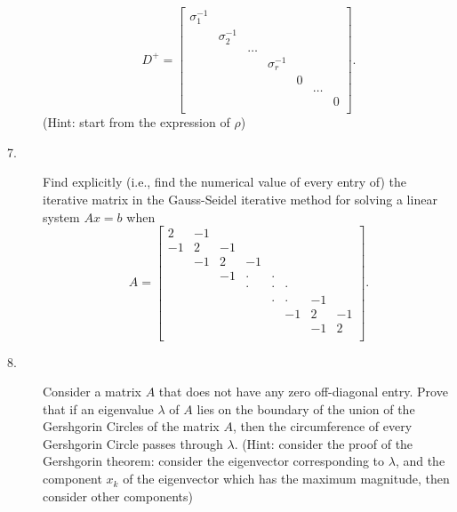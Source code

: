 \documentclass{article}
\begin{document}
\begin{description}
$$D^+ = \begin{bmatrix}
        \sigma_1^{-1} &&&&&& \\
        & \sigma_2^{-1} &&&&& \\
        && \dots &&&& \\
        &&& \sigma_r^{-1} &&& \\
        &&&& 0 && \\
        &&&&& \dots & \\
        &&&&&& 0 \\
        \end{bmatrix}.$$
(Hint: start from the expression of $\rho$)

\item[7.]
Find explicitly (i.e., find the numerical value of every entry of) the
iterative matrix in the Gauss-Seidel iterative method for solving a linear
system $Ax=b$ when
$$A= \begin{bmatrix}
        2&-1&&&&&& \\
        -1 & 2 & -1 &&&&& \\
        & -1 & 2 & -1 &&&& \\
        && -1 & \cdot & \cdot &&& \\
        &&& \cdot & \cdot & \cdot &&\\
        &&&& \cdot & \cdot & -1 & \\
        &&&&& -1 & 2 & -1 \\
        &&&&&& -1 & 2 \\
        \end{bmatrix}.$$

\item[8.]
Consider a matrix $A$ that does not have any zero off-diagonal entry. Prove
that if an eigenvalue $\lambda$ of $A$ lies on the boundary of the union of
the Gershgorin Circles of the matrix $A$, then the circumference of every
Gershgorin Circle passes through $\lambda$. (Hint: consider the proof of the
Gershgorin theorem: consider the eigenvector corresponding to $\lambda$, and
the component $x_k$ of the eigenvector which has the maximum magnitude, then
consider other components)

\end{description}    
\end{document}
